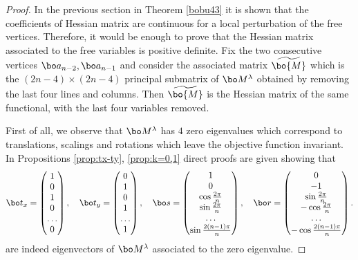 \begin{proof} In the previous section in Theorem \ref{bobu43} it is shown that the coefficients of Hessian matrix are continuous for a local perturbation of the free vertices. Therefore, it would be enough to prove that the Hessian matrix associated to the free variables is positive definite. Fix the two consecutive vertices $\bo a_{n-2},\bo a_{n-1}$ and consider the associated matrix $\widetilde{\bo{M}}$ which is the $(2n-4)\times(2n-4)$ principal submatrix of $\bo M^\lambda$ obtained by removing the last four lines and columns. Then $\widetilde{\bo{M}}$ is the Hessian matrix of the same functional, with the last four variables removed.

First of all, we observe that $\bo M^\lambda$ has $4$ zero eigenvalues which correspond to translations, scalings and rotations which leave the objective function invariant. In Propositions \ref{prop:tx-ty}, \ref{prop:k=0,1} direct proofs are given showing that
\begin{equation}\bo t_x= \begin{pmatrix} 1\\0\\1\\0\\ \dots\\0\end{pmatrix},\quad \bo t_y= \begin{pmatrix} 0\\1\\0\\1\\ \dots\\1 \end{pmatrix},\quad \bo s=\begin{pmatrix} 1\\ 0\\ \cos\frac {2\pi}{n} \\ \sin\frac {2\pi}{n}\\ \dots\\\sin \frac{2(n-1) \pi}{n} \end{pmatrix}, \quad\bo r=\begin{pmatrix} 0\\-1\\\sin \frac{2 \pi}{n} \\- \cos\frac {2\pi}{n} \\ \dots\\ -\cos \frac{2(n-1) \pi}{n} \end{pmatrix}.
\label{eq:eigenvectors-zero}
\end{equation}
are indeed eigenvectors of $\bo M^\lambda$ associated to the zero eigenvalue.


\end{proof}
